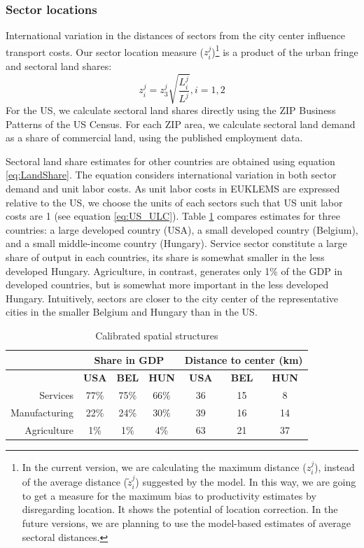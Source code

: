 \documentclass[12pt]{article}
\begin{document}
\subsubsection{Sector locations}

International variation in the distances of sectors from the city center influence transport costs. Our sector location measure ($z_i^j$)\footnote{In the current version, we are calculating the maximum distance ($z_i^j$), instead of the average distance ($\tilde{z}_i^j$) suggested by the model. In this way, we are going to get a measure for the maximum bias to productivity estimates by disregarding location. It shows the potential of location correction. In the future versions, we are planning to use the model-based estimates of average sectoral distances.} is a product of the urban fringe and sectoral land shares:
\begin{equation*}
z_i^j=z_3^j\sqrt{\frac{L_i^j}{L^j}},i=1,2
\end{equation*}
For the US, we calculate sectoral land shares directly using the ZIP Business Patterns of the US Census. For each ZIP area, we calculate sectoral land demand as a share of commercial land, using the published employment data. %

Sectoral land share estimates for other countries are obtained using equation \ref{eq:LandShare}. The equation considers international variation in both sector demand and unit labor costs. As unit labor costs in EUKLEMS are expressed relative to the US, we choose the units of each sectors such that US unit labor costs are 1 (see equation \ref{eq:US_ULC}). Table \ref{tab:spatial_eg} compares estimates for three countries: a large developed country (USA), a small developed country (Belgium), and a small middle-income country (Hungary). Service sector constitute a large share of output in each countries, its share is somewhat smaller in the less developed Hungary. Agriculture, in contrast, generates only 1\% of the GDP in developed countries, but is somewhat more important in the less developed Hungary. Intuitively, sectors are closer to the city center of the representative cities in the smaller Belgium and Hungary than in the US.

\begin{table}[h!]
  \centering
  \caption{Calibrated spatial structures}
    \begin{tabular}{rcccccc}
    \toprule
    \textbf{} & \multicolumn{3}{c}{\textbf{Share in GDP}} & \multicolumn{3}{c}{\textbf{Distance to center (km)}} \\
    \midrule
    \textbf{} & \textbf{USA} & \textbf{BEL} & \textbf{HUN} & \textbf{USA} & \textbf{BEL} & \textbf{HUN} \\
    Services & 77\%  & 75\%  & 66\%  & 36    & 15    & 8 \\
    Manufacturing & 22\%  & 24\%  & 30\%  & 39    & 16    & 14 \\
    Agriculture & 1\%   & 1\%   & 4\%   & 63    & 21    & 37 \\
    \bottomrule
    \end{tabular}%
  \label{tab:spatial_eg}%
\end{table}%
\end{document}
